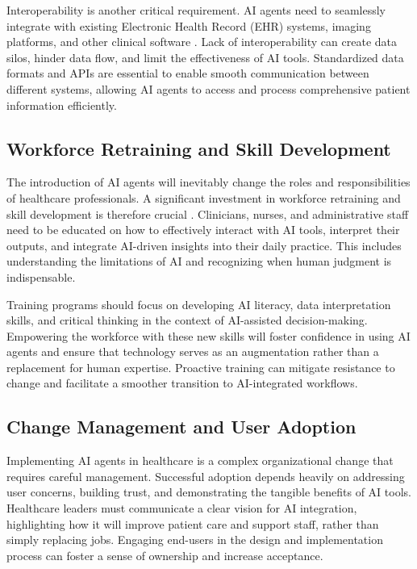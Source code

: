 \documentclass[12pt,a4paper]{article}
\begin{document}
Interoperability is another critical requirement. AI agents need to seamlessly integrate with existing Electronic Health Record (EHR) systems, imaging platforms, and other clinical software \cite{alation_data_catalog}. Lack of interoperability can create data silos, hinder data flow, and limit the effectiveness of AI tools. Standardized data formats and APIs are essential to enable smooth communication between different systems, allowing AI agents to access and process comprehensive patient information efficiently.

\subsection{Workforce Retraining and Skill Development}
\label{sec:workforce_retraining}
The introduction of AI agents will inevitably change the roles and responsibilities of healthcare professionals. A significant investment in workforce retraining and skill development is therefore crucial \cite{relias_healthcare_lms}. Clinicians, nurses, and administrative staff need to be educated on how to effectively interact with AI tools, interpret their outputs, and integrate AI-driven insights into their daily practice. This includes understanding the limitations of AI and recognizing when human judgment is indispensable.

Training programs should focus on developing AI literacy, data interpretation skills, and critical thinking in the context of AI-assisted decision-making. Empowering the workforce with these new skills will foster confidence in using AI agents and ensure that technology serves as an augmentation rather than a replacement for human expertise. Proactive training can mitigate resistance to change and facilitate a smoother transition to AI-integrated workflows.

\subsection{Change Management and User Adoption}
\label{sec:change_management}
Implementing AI agents in healthcare is a complex organizational change that requires careful management. Successful adoption depends heavily on addressing user concerns, building trust, and demonstrating the tangible benefits of AI tools. Healthcare leaders must communicate a clear vision for AI integration, highlighting how it will improve patient care and support staff, rather than simply replacing jobs. Engaging end-users in the design and implementation process can foster a sense of ownership and increase acceptance.
\end{document}
